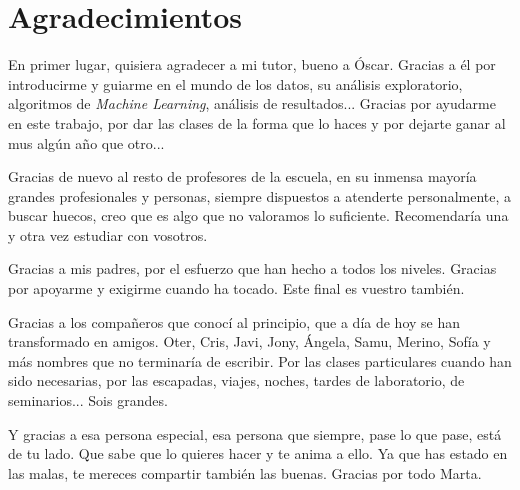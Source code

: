 \chapter* {Agradecimientos}


	En primer lugar, quisiera agradecer a mi tutor, bueno a Óscar. Gracias a él por introducirme y guiarme en el mundo de los datos, su análisis exploratorio, algoritmos de \textit{Machine Learning}, análisis de resultados... Gracias por ayudarme en este trabajo, por dar las clases de la forma que lo haces y por dejarte ganar al mus algún año que otro...\par 
	\vspace*{0.75cm}
	Gracias de nuevo al resto de profesores de la escuela, en su inmensa mayoría grandes profesionales y personas, siempre dispuestos a atenderte personalmente, a buscar huecos, creo que es algo que no valoramos lo suficiente. Recomendaría una y otra vez estudiar con vosotros.\par 
	\vspace*{0.75cm}
	Gracias a mis padres, por el esfuerzo que han hecho a todos los niveles. Gracias por apoyarme y exigirme cuando ha tocado. Este final es vuestro también.\par 
	\vspace*{0.75cm}
	Gracias a los compañeros que conocí al principio, que a día de hoy se han transformado en amigos.
	Oter, Cris, Javi, Jony, Ángela, Samu, Merino, Sofía y más nombres que no terminaría de escribir. Por las clases particulares cuando han sido necesarias, por las escapadas, viajes, noches, tardes de laboratorio, de seminarios... Sois grandes.\par 
	\vspace*{0.75cm}
	Y gracias a esa persona especial, esa persona que siempre, pase lo que pase, está de tu lado. Que sabe que lo quieres hacer y te anima a ello. Ya que has estado en las malas, te mereces compartir también las buenas. Gracias por todo Marta.
